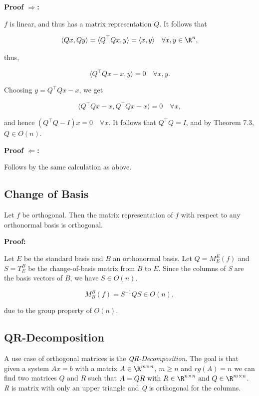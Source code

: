 \textbf{Proof \(\Rightarrow\):} 

\(f\) is linear, and thus has a matrix representation \( Q \). It follows that

\[
    \langle Qx, Qy \rangle = \langle Q^\top Qx, y \rangle = \langle x, y \rangle \quad \forall x, y 
    \in \R^n,
\]

thus,

\[
    \langle Q^\top Qx - x, y \rangle = 0 \quad \forall x, y.
\]

Choosing \( y = Q^\top Qx - x \), we get

\[
    \langle Q^\top Qx - x, Q^\top Qx - x \rangle = 0 \quad \forall x,
\]

and hence \( (Q^\top Q - I)x = 0 \quad \forall x \).  
It follows that \( Q^\top Q = I \), and by Theorem 7.3, \( Q \in O(n) \).

\QED

\textbf{Proof \(\Leftarrow\):} 

Follows by the same calculation as above.

\QED

\subsection{Change of Basis}

Let \(f\) be orthogonal. Then the matrix representation of \(f\)  
with respect to any orthonormal basis is orthogonal.

\textbf{Proof:} 

Let \( E \) be the standard basis and \(B\) an orthonormal basis. Let  
\( Q = M_E^E(f) \) and \( S = T_E^B \) be the change-of-basis matrix from \(B\) to \( E \).  
Since the columns of \emph{S} are the basis vectors of \(B\), we have \( S \in O(n) \).  

\[
    M_B^B(f) = S^{-1} Q S \in O(n),
\]

due to the group property of \( O(n) \).

\QED

\subsection{QR-Decomposition}

A use case of orthogonal matrices is the \emph{QR-Decomposition}. The goal is that given a system 
\( Ax = b\) with a matrix \(A\in \R^{m \times n}\), \(m \ge n\) and \(rg(A) = n\) we can find 
two matrices \(Q \text{ and } R\) such that \(A = QR \text{ with } R\in \R^{n \times n} 
\text{ and } Q \in \R^{m \times n}\). \emph{R} is matrix with only an upper triangle and 
\emph{Q} is orthogonal for the columns.

